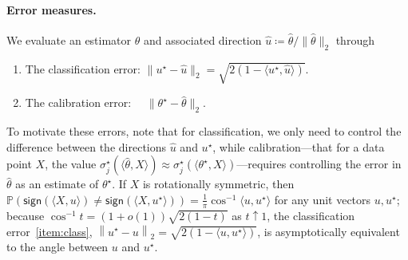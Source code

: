 \documentclass[11pt]{article}
\renewcommand{\P}{\mathbb{P}}
\newcommand{\norm}[1]{\left\|{#1}\right\|} %
\newcommand{\what}[1]{\widehat{#1}}
\newcommand{\sgn}{\mathsf{sign}}
\newcommand{\ltwo}[1]{\norm{#1}_2} %
\newcommand{\norms}[1]{\|{#1}\|} %
\newcommand{\ltwos}[1]{\norms{#1}_2} %
\newcommand{\<}{\langle} %
\renewcommand{\>}{\rangle}
\newcommand{\defeq}{\coloneqq}
\newcommand{\opt}{^\star}
\begin{document}
\paragraph{Error measures.}
We evaluate an estimator $\what{\theta}$ and associated direction $\what{u}
\defeq \what{\theta} / \ltwos{\what{\theta}}$ through
\begin{enumerate}[leftmargin=10em,label=(\textsc{E}.\roman*)]
\item \label{item:class}
  The classification error: $\ltwos{u\opt - \what{u}}
  = \sqrt{2(1 - \<u\opt, \what{u}\>)}$.
\item \label{item:cal}
  The calibration error:~~ $\ltwos{\theta\opt - \what{\theta}}$.
\end{enumerate}
To motivate these errors, note that for classification, we only need to
control the difference between the directions $\what{u}$ and $u\opt$, while
calibration---that for a data point $X$, the value $\sigma_j\opt( \<
\what{\theta}, X \>)\approx \sigma_j\opt(\< \theta\opt, X \>)$---requires
controlling the error in $\what{\theta}$ as an estimate of $\theta\opt$.
%
If $X$ is rotationally symmetric,
then $\P(\sgn(\<X, u\>) \neq \sgn(\<X, u\opt\>)) = \frac{1}{\pi}
\cos^{-1}\<u, u\opt\>$ for any unit vectors $u, u\opt$; because $\cos^{-1} t
= (1 + o(1)) \sqrt{2(1 - t)}$ as $t \uparrow 1$, the classification
error~\ref{item:class}, $\ltwo{u\opt - u} =
\sqrt{2(1 - \<u, u\opt\>)}$, is asymptotically equivalent to the angle
between $u$ and $u\opt$.
\end{document}
